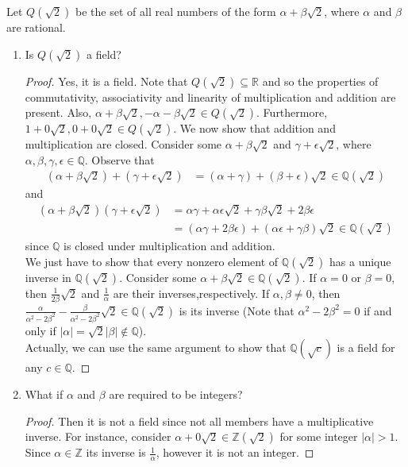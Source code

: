 \documentclass[12pt]{article}
\newcommand{\Z}{\mathbb{Z}}
\newcommand{\R}{\mathbb{R}}
\newcommand{\Q}{\mathbb{Q}}
\newenvironment{problem}[2][Problem]{\begin{trivlist} \item[\hskip \labelsep {\bfseries #1}\hskip \labelsep {\bfseries #2.}]}{\end{trivlist}}
\begin{document}
\begin{problem}{5}
  Let $Q(\sqrt{2})$ be the set of all real numbers of the form $\alpha + \beta\sqrt{2}$, where $\alpha$ and $\beta$ are rational.
\begin{enumerate}
  \item Is $Q(\sqrt{2})$ a field?
\begin{proof}
  Yes, it is a field. Note that $Q(\sqrt{2})\subseteq \R$ and so the properties of commutativity, associativity and linearity of multiplication and addition are present. Also, $\alpha+\beta\sqrt{2},-\alpha-\beta\sqrt{2}\in Q(\sqrt{2})$. Furthermore, $1+0\sqrt{2},0+0\sqrt{2}\in Q(\sqrt{2})$. We now show that addition and multiplication are closed. Consider some $\alpha +\beta\sqrt{2}$ and $\gamma + \epsilon\sqrt{2}$, where $\alpha,\beta,\gamma,\epsilon\in \Q$. Observe that
\begin{align*}
  \left( \alpha + \beta\sqrt{2} \right)+\left( \gamma +\epsilon\sqrt{2} \right)&= (\alpha+\gamma)+(\beta+\epsilon)\sqrt{2}\in \Q\left(\sqrt{2}\right)
\end{align*}
and 
\begin{align*}
  \left( \alpha + \beta\sqrt{2} \right)\left( \gamma +\epsilon\sqrt{2} \right)&= \alpha\gamma + \alpha\epsilon\sqrt{2} +\gamma\beta\sqrt{2} + 2\beta\epsilon\\
  &= (\alpha\gamma+2\beta\epsilon) + (\alpha\epsilon+\gamma\beta)\sqrt{2} \in \Q\left( \sqrt{2} \right)
\end{align*}
since $\Q$ is closed under multiplication and addition.\\

We just have to show that every nonzero element of $\Q\left( \sqrt{2} \right)$ has a unique inverse in $\Q\left( \sqrt{2} \right)$. Consider some $\alpha + \beta\sqrt{2} \in \Q\left( \sqrt{2} \right)$. If $\alpha = 0$ or $\beta =0$, then $\frac{1}{2\beta}\sqrt{2}$ and $\frac{1}{\alpha}$ are their inverses,respectively. If $\alpha,\beta\neq 0$, then $\frac{\alpha}{\alpha^{2}-2\beta^{2}}-\frac{\beta}{\alpha^{2}-2\beta^{2}}\sqrt{2}\in \Q\left( \sqrt{2} \right)$ is its inverse (Note that $\alpha^{2} - 2\beta^{2} = 0$ if and only if $|\alpha| = \sqrt{2}|\beta| \not\in \Q$). \\
Actually, we can use the same argument to show that $\Q\left( \sqrt{c} \right)$ is a field for any $c\in \Q$.
\end{proof}
  \item What if $\alpha$ and $\beta$ are required to be integers?
\begin{proof}
  Then it is not a field since not all members have a multiplicative inverse. For instance, consider $\alpha + 0\sqrt{2}\in \Z\left( \sqrt{2} \right)$ for some integer $|\alpha|>1$. Since $\alpha\in \Z$ its inverse is $\frac{1}{\alpha}$, however it is not an integer.
\end{proof}
\end{enumerate}
\end{problem}
\end{document}
